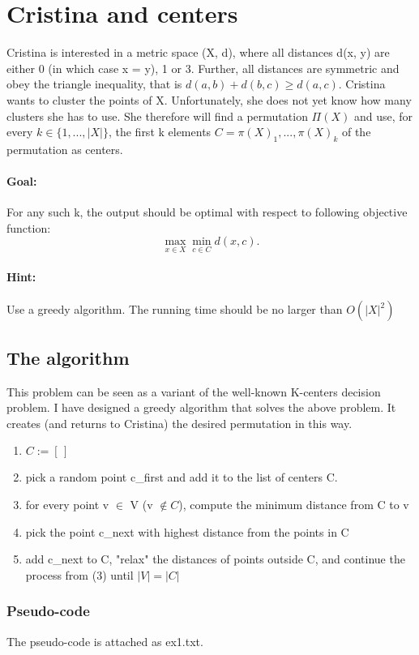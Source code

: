 \section{Cristina and centers}
Cristina is interested in a metric space (X, d), where all distances d(x, y) are
either 0 (in which case x = y), 1 or 3. Further, all distances are symmetric and obey the triangle inequality, that is $d(a, b) + d(b, c) \geq d(a, c)$. Cristina wants to cluster the points of X. Unfortunately, she does not yet know how many clusters she has to use. She therefore will find a permutation $\Pi(X)$ and use, for every $k \in \{1, ..., |X|\}$, the first k elements $C =
{\pi(X)_1, ..., \pi(X)_k}$ of the permutation as centers.
\paragraph*{Goal:} For any such k, the output should be optimal with respect to following objective function:
\begin{equation}
\max_{x \in X} \min_{c \in C} d(x,c).
\end{equation}
\paragraph*{Hint:} Use a greedy algorithm. The running time should be no larger than $O(|X|^2)$

\subsection{The algorithm}
This problem can be seen as a variant of the well-known \cite{K-center} K-centers decision problem. I have designed a greedy algorithm that solves the above problem.
It creates (and returns to Cristina) the desired permutation in this way.
\begin{enumerate}
	\item $C:= [\,]$
	\item pick a random point c\_first and add it to the list of centers C.
	\item for every point v $\in$ V (v $\notin C$), compute the minimum distance from C to v 
	\item pick the point c\_next with highest distance from the points in C
	\item add c\_next to C, "relax" the distances of points outside C, and continue the process from (3) until $|V| = |C|$
\end{enumerate}

\subsubsection{Pseudo-code}
The pseudo-code is attached as ex1.txt.

